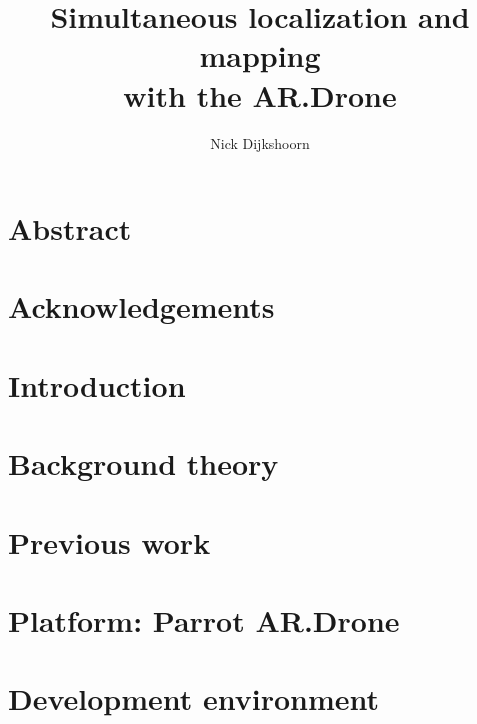 \documentclass[twoside]{uva-bachelor-thesis}
\title{Simultaneous localization and mapping \\ \vspace{0.5cm} with the AR.Drone}
\author{Nick Dijkshoorn}
\begin{document}
\maketitle





\chapter*{Abstract}




\chapter*{Acknowledgements}




\tableofcontents
{}



\chapter{Introduction}




\chapter{Background theory}



\chapter{Previous work}




\chapter{Platform: Parrot AR.Drone}




\chapter{Development environment}

\end{document}
